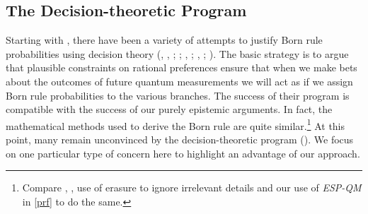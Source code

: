 \documentclass[12pt,onecolumn,secnumarabic,amsmath,amssymb,balancelastpage,nofootinbib]{article}
\begin{document}
\subsection{The Decision-theoretic Program}

Starting with \citep{deutsch1999}, there have been a variety of attempts to justify Born rule probabilities using decision theory (\citeauthor{greaves2004}, \citeyear{greaves2004}, \citeyear{greaves2007b}; \citealp{greavesM}; \citeauthor{wallace2003b}, \citeyear{wallace2003b}; \citeyear{wallace2010b}, \citeyear{wallace2012}; \citealp{wilson2013objective}).  The basic strategy is to argue that plausible constraints on rational preferences ensure that when we make bets about the outcomes of future quantum measurements we will act as if we assign Born rule probabilities to the various branches.  The success of their program is compatible with the success of our purely epistemic arguments.  In fact, the mathematical methods used to derive the Born rule are quite similar.\footnote{Compare , \citeyear[]{wallace2012}, use of erasure to ignore irrelevant details and our use of \emph{ESP-QM} in \textsection \ref{prf} to do the same.}  At this point, many remain unconvinced by the decision-theoretic program (\citealp{baker2007, albert2010, price2010, dizadji2013, maudlinreview}).  We focus on one particular type of concern here to highlight an advantage of our approach.
\end{document}
